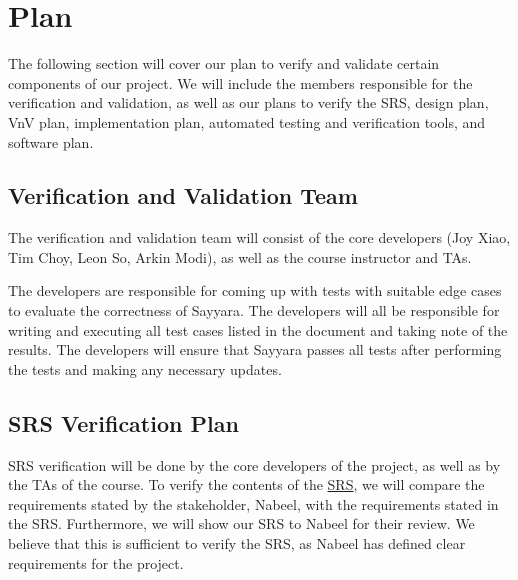 \documentclass[12pt, titlepage]{article}
\begin{document}

\section{Plan}

The following section will cover our plan to verify and validate certain components of our project.
We will include the members responsible for the verification and validation, as well as our plans
to verify the SRS, design plan, VnV plan, implementation plan, automated testing and verification
tools, and software plan.


\subsection{Verification and Validation Team}

The verification and validation team will consist of the core developers (Joy Xiao, Tim Choy, Leon
So, Arkin Modi), as well as the course instructor and TAs.

The developers are responsible for coming up with tests with suitable edge cases to evaluate the
correctness of Sayyara. The developers will all be responsible for writing and executing all test
cases listed in the document and taking note of the results. The developers will ensure that
Sayyara passes all tests after performing the tests and making any necessary updates.

\subsection{SRS Verification Plan}

SRS verification will be done by the core developers of the project, as well as by the TAs of the
course. To verify the contents of the
\href{https://github.com/arkinmodi/project-sayyara/blob/main/docs/SRS/SRS.pdf}{SRS}, we will
compare the requirements stated by the stakeholder, Nabeel, with the requirements stated in the
SRS. Furthermore, we will show our SRS to Nabeel for their review. We believe that this is
sufficient to verify the SRS, as Nabeel has defined clear requirements for the project.
\end{document}
